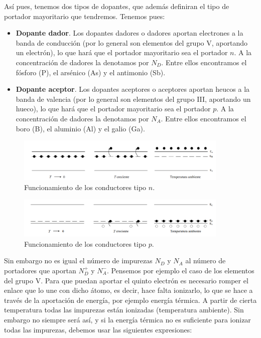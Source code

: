 Así pues, tenemos dos tipos de dopantes, que además definiran el tipo de portador mayoritario que tendremos. Tenemos pues:

\begin{itemize}
	\item \textbf{Dopante dador}. Los dopantes dadores o dadores aportan electrones a la banda de conducción (por lo general son elementos del grupo V, aportando un electrón), lo que hará que el portador mayoritario sea el portador $n$. A la concentración de dadores la denotamos por $N_D$. Entre ellos encontramos el fósforo (P), el arsénico (As) y el antimonio (Sb).
	\item \textbf{Dopante aceptor}. Los dopantes aceptores o aceptores aportan heucos a la banda de valencia (por lo general son elementos del grupo III, aportando un hueco), lo que hará que el portador mayoritario sea el portador $p$. A la concentración de dadores la denotamos por $N_A$. Entre ellos encontramos el boro (B), el aluminio (Al) y el galio (Ga).
\end{itemize}

\begin{figure}[h!] \centering
	\includegraphics[width=0.9\textwidth]{Cuerpo/Ch_01/01_04.png}
	\caption{Funcionamiento de los conductores tipo $n$.}
\end{figure}

\begin{figure}[h!] \centering
	\includegraphics[width=0.9\textwidth]{Cuerpo/Ch_01/01_05.png}
	\caption{Funcionamiento de los conductores tipo $p$.}
\end{figure}

Sin embargo no es igual el número de impurezas $N_D$ y $N_A$ al número de portadores que aportan $N_D^+$ y $N_A^-$. Pensemos por ejemplo el caso de los elementos del grupo V. Para que puedan aportar el quinto electrón es necesario romper el enlace que lo une con dicho átomo, es decir, hace falta ionizarlo, lo que se hace a través de la aportación de energía, por ejemplo energía térmica. A partir de cierta temperatura todas las impurezas están ionizadas (temperatura ambiente). Sin embargo no siempre será así, y si la energía térmica no es suficiente para ionizar todas las impurezas, debemos usar las siguientes expresiones:

